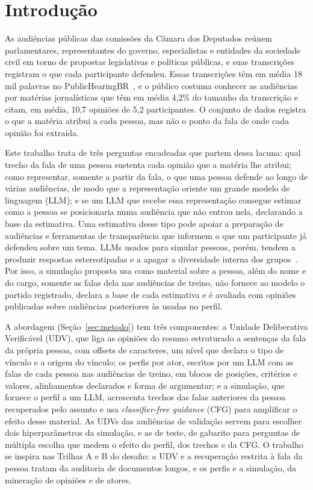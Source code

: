 \section{Introdu\c{c}\~ao}
\label{sec:introducao}

As audiências públicas das comissões da Câmara dos Deputados reúnem parlamentares, representantes
do governo, especialistas e entidades da sociedade civil em torno de propostas legislativas e
políticas públicas, e suas transcrições registram o que cada participante defendeu. Essas
transcrições têm em média 18 mil palavras no PublicHearingBR~\citep{fernandes2024publichearingbr}, e o
público costuma conhecer as audiências por matérias jornalísticas que têm em média 4,2\% do tamanho
da transcrição e citam, em média, 10,7 opiniões de 5,2 participantes. O conjunto de dados registra o
que a matéria atribui a cada pessoa, mas não o ponto da fala de onde cada opinião foi extraída.

Este trabalho trata de três perguntas encadeadas que partem dessa lacuna: qual trecho da fala de uma
pessoa sustenta cada opinião que a matéria lhe atribui; como representar, somente a partir da fala,
o que uma pessoa defende ao longo de várias audiências, de modo que a representação oriente um grande
modelo de linguagem (LLM); e se um LLM que recebe essa representação consegue estimar como a pessoa
se posicionaria numa audiência que não entrou nela, declarando a base da estimativa. Uma estimativa
desse tipo pode apoiar a preparação de audiências e ferramentas de transparência que informem o que
um participante já defendeu sobre um tema. LLMs usados para simular pessoas, porém, tendem a produzir
respostas estereotipadas e a apagar a diversidade interna dos
grupos~\citep{bisbee2024synthetic,wang2025large}. Por isso, a simulação proposta usa como material
sobre a pessoa, além do nome e do cargo, somente as falas dela nas audiências de treino, não fornece
ao modelo o partido registrado, declara a base de cada estimativa e é avaliada com opiniões
publicadas sobre audiências posteriores às usadas no perfil.

A abordagem (Seção~\ref{sec:metodo}) tem três componentes: a Unidade Deliberativa Verificável (UDV),
que liga as opiniões do resumo estruturado a sentenças da fala da própria pessoa, com offsets de
caracteres, um nível que declara o tipo de vínculo e a origem do vínculo; os perfis por ator, escritos
por um LLM com as falas de cada pessoa nas audiências de treino, em blocos de posições, critérios e
valores, alinhamentos declarados e forma de argumentar; e a simulação, que fornece o perfil a um LLM,
acrescenta trechos das falas anteriores da pessoa recuperados pelo assunto e usa
\textit{classifier-free guidance} (CFG) para amplificar o efeito desse material. As UDVs das
audiências de validação servem para escolher dois hiperparâmetros da simulação, e as de teste, de
gabarito para perguntas de múltipla escolha que medem o efeito do perfil, dos trechos e da CFG. O
trabalho se inspira nas Trilhas A e B do desafio: a UDV e a recuperação restrita à fala da pessoa
tratam da auditoria de documentos longos, e os perfis e a simulação, da mineração de opiniões e de
atores.

